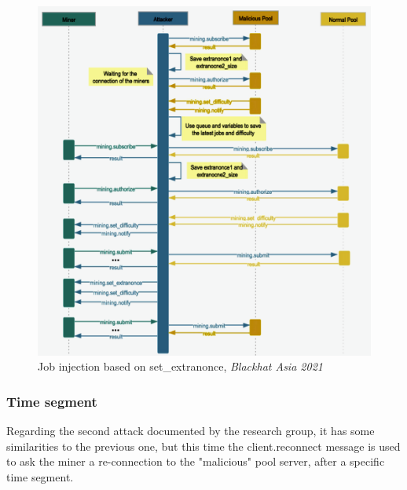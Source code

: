 \begin{figure}[h!]
    \centering
    \includegraphics[width=14cm]{Figures/stratum/stratum5.png}
    \caption{Job injection based on set\_extranonce, \textit{Blackhat Asia 2021}}
    \label{fig:stratum5}
\end{figure}

\subsubsection{\textbf{Time segment}}
\noindent Regarding the second attack documented by the research group, it has some similarities to the previous one, but this time the client.reconnect message is used to ask the miner a re-connection to the "malicious" pool server, after a specific time segment.


